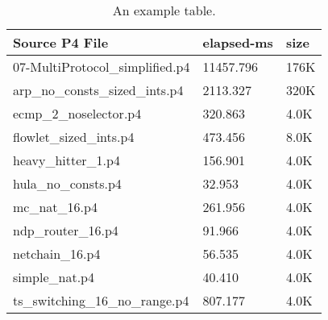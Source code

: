\begin{table}
	\begin{center}
		\begin{tabular}{|l|l|l|}
			\hline
			Source P4 File & elapsed-ms & size \\
			\hline
			07-MultiProtocol_simplified.p4 & 11457.796 & 176K \\
			\hline
			arp_no_consts_sized_ints.p4 & 2113.327 & 320K \\
			\hline
			ecmp_2_noselector.p4 & 320.863 & 4.0K \\
			\hline
			flowlet_sized_ints.p4 & 473.456 & 8.0K \\
			\hline
			heavy_hitter_1.p4 & 156.901 & 4.0K \\
			\hline
			hula_no_consts.p4 & 32.953 & 4.0K \\
			\hline
			mc_nat_16.p4 & 261.956 & 4.0K \\
			\hline
			ndp_router_16.p4 & 91.966 & 4.0K \\
			\hline
			netchain_16.p4 & 56.535 & 4.0K \\
			\hline
			simple_nat.p4 & 40.410 & 4.0K \\
			\hline
			ts_switching_16_no_range.p4 & 807.177 & 4.0K \\
			\hline
		\end{tabular}
	\end{center}
	\caption{An example table.}
	\label{table:example_table}
\end{table}